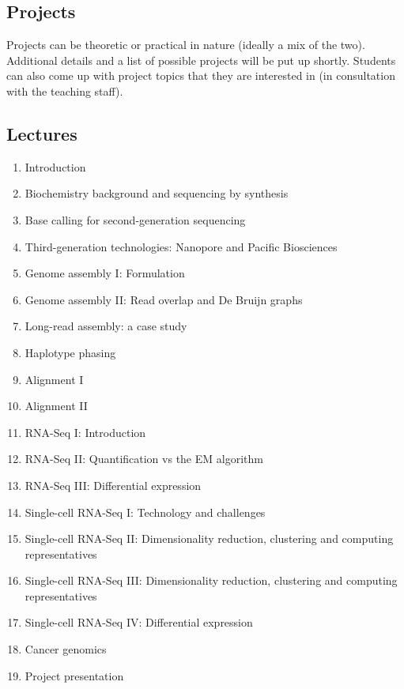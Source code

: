 \documentclass[11pt,onecolumn]{article}
\begin{document}
\subsection*{Projects}
Projects can be theoretic or practical in nature (ideally a mix of the two). Additional details and a list of possible projects will be put up shortly. Students can also come up with project topics that they are interested in (in consultation with the teaching staff). \\

\pagebreak

\subsection*{Lectures}
\begin{enumerate}
	\item Introduction
	\item Biochemistry background and sequencing by synthesis
	\item Base calling for second-generation sequencing
	\item Third-generation technologies: Nanopore and Pacific Biosciences
	\item Genome assembly I: Formulation
	\item Genome assembly II: Read overlap and De Bruijn graphs
	\item Long-read assembly: a case study
	\item Haplotype phasing
	\item Alignment I
	\item Alignment II
	\item RNA-Seq I: Introduction
	\item RNA-Seq II: Quantification vs the EM algorithm
	\item RNA-Seq III: Differential expression
	\item Single-cell RNA-Seq I: Technology and challenges
	\item Single-cell RNA-Seq II: Dimensionality reduction, clustering and computing representatives
	\item Single-cell RNA-Seq III: Dimensionality reduction, clustering and computing representatives
	\item Single-cell RNA-Seq IV: Differential expression
	\item Cancer genomics
	\item Project presentation
\end{enumerate}
\end{document}
